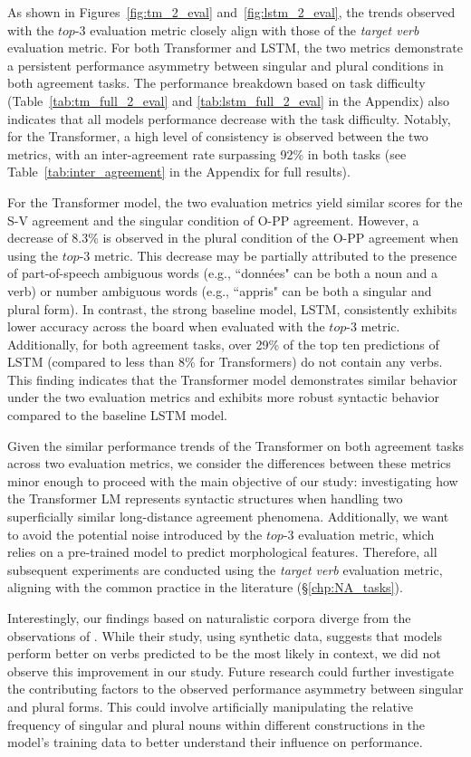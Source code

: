 As shown in Figures~\ref{fig:tm_2_eval} and~\ref{fig:lstm_2_eval}, the trends observed with the $top$-3 evaluation metric closely align with those of the \textit{target verb} evaluation metric. For both Transformer and LSTM, the two metrics demonstrate a persistent performance asymmetry between singular and plural conditions in both agreement tasks. The performance breakdown based on task difficulty (Table~\ref{tab:tm_full_2_eval} and \ref{tab:lstm_full_2_eval} in the Appendix) also indicates that all models performance decrease with the task difficulty. Notably, for the Transformer, a high level of consistency is observed between the two metrics, with an inter-agreement rate surpassing 92\% in both tasks (see Table~\ref{tab:inter_agreement} in the Appendix for full results).

For the Transformer model, the two evaluation metrics yield similar scores for the S-V agreement and the singular condition of O-PP agreement. However, a decrease of 8.3\% is observed in the plural condition of the O-PP agreement when using the $top$-3 metric. This decrease may be partially attributed to the presence of part-of-speech ambiguous words (e.g., ``données" can be both a noun and a verb) or number ambiguous words (e.g., ``appris" can be both a singular and plural form). In contrast, the strong baseline model, LSTM, consistently exhibits lower accuracy across the board when evaluated with the $top$-3 metric. Additionally, for both agreement tasks, over 29\% of the top ten predictions of LSTM (compared to less than 8\% for Transformers) do not contain any verbs. This finding indicates that the Transformer model demonstrates similar behavior under the two evaluation metrics and exhibits more robust syntactic behavior compared to the baseline LSTM model.

Given the similar performance trends of the Transformer on both agreement tasks across two evaluation metrics, we consider the differences between these metrics minor enough to proceed with the main objective of our study: investigating how the Transformer LM represents syntactic structures when handling two superficially similar long-distance agreement phenomena. Additionally, we want to avoid the potential noise introduced by the $top$-3 evaluation metric, which relies on a pre-trained model to predict morphological features. 
Therefore, all subsequent experiments are conducted using the \emph{target verb} evaluation metric, aligning with the common practice in the literature (\S\ref{chp:NA_tasks}).


Interestingly, our findings based on naturalistic corpora diverge from the observations of \cite{newman-etal-2021-refining}. While their study, using synthetic data, suggests that models perform better on verbs predicted to be the most likely in context, we did not observe this improvement in our study. Future research could further investigate the contributing factors to the observed performance asymmetry between singular and plural forms. This could involve artificially manipulating the relative frequency of singular and plural nouns within different constructions in the model's training data to better understand their influence on performance.



